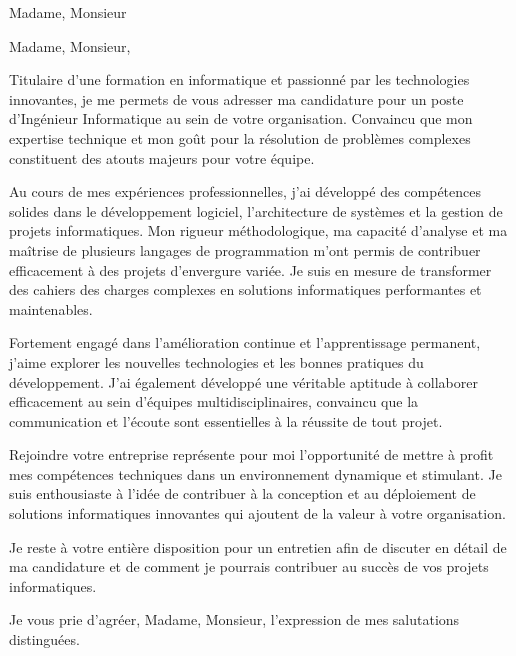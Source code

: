 \documentclass[10pt]{lettre}
\begin{document}
\begin{letter}{Madame, Monsieur}
\address{Laurent Poirier\\47, rue du stade\\79210 Saint Georges de Rex\\France}
\nofax

\def\concname{Objet :~} %
\opening{Madame, Monsieur,}

Titulaire d'une formation en informatique et passionné par les technologies innovantes, je me permets de vous adresser ma candidature 
pour un poste d'Ingénieur Informatique au sein de votre organisation. Convaincu que mon expertise technique et mon goût pour la résolution 
de problèmes complexes constituent des atouts majeurs pour votre équipe.

Au cours de mes expériences professionnelles, j'ai développé des compétences solides dans le développement logiciel, l'architecture 
de systèmes et la gestion de projets informatiques. Mon rigueur méthodologique, ma capacité d'analyse et ma maîtrise de plusieurs 
langages de programmation m'ont permis de contribuer efficacement à des projets d'envergure variée. Je suis en mesure de transformer 
des cahiers des charges complexes en solutions informatiques performantes et maintenables.

Fortement engagé dans l'amélioration continue et l'apprentissage permanent, j'aime explorer les nouvelles technologies et 
les bonnes pratiques du développement. J'ai également développé une véritable aptitude à collaborer efficacement au sein d'équipes 
multidisciplinaires, convaincu que la communication et l'écoute sont essentielles à la réussite de tout projet.

Rejoindre votre entreprise représente pour moi l'opportunité de mettre à profit mes compétences techniques dans un environnement 
dynamique et stimulant. Je suis enthousiaste à l'idée de contribuer à la conception et au déploiement de solutions informatiques 
innovantes qui ajoutent de la valeur à votre organisation.

Je reste à votre entière disposition pour un entretien afin de discuter en détail de ma candidature et de comment je pourrais 
contribuer au succès de vos projets informatiques.

\closing{Je vous prie d'agréer, Madame, Monsieur, l'expression de mes salutations distinguées.}

\end{letter}
\end{document}
